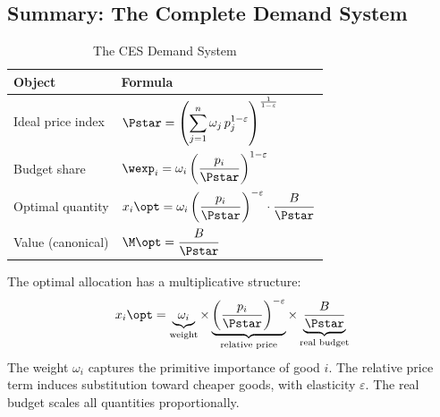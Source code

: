 \subsection{Summary: The Complete Demand System}
\label{subsec:summary}

\begin{table}[H]
\centering
\caption{The CES Demand System}
\label{tab:demand-system}
\renewcommand{\arraystretch}{1.6}
\begin{tabular}{@{}ll@{}}
\toprule
\textbf{Object} & \textbf{Formula} \\
\midrule
Ideal price index & $\displaystyle \Pstar = \left( \sum_{j=1}^{n} \omega_j \, p_j^{1-\varepsilon} \right)^{\frac{1}{1-\varepsilon}}$ \\[12pt]
Budget share & $\displaystyle \wexp_i = \omega_i \left(\frac{p_i}{\Pstar}\right)^{1-\varepsilon}$ \\[12pt]
Optimal quantity & $\displaystyle x_i\opt = \omega_i \left(\frac{p_i}{\Pstar}\right)^{-\varepsilon} \cdot \frac{B}{\Pstar}$ \\[12pt]
Value (canonical) & $\displaystyle \M\opt = \frac{B}{\Pstar}$ \\[8pt]
\bottomrule
\end{tabular}
\end{table}

\begin{callouttip}[Interpretation]
The optimal allocation has a multiplicative structure:
\[
x_i\opt = \underbrace{\omega_i}_{\text{weight}} \times \underbrace{\left(\frac{p_i}{\Pstar}\right)^{-\varepsilon}}_{\text{relative price}} \times \underbrace{\frac{B}{\Pstar}}_{\text{real budget}}
\]
The weight $\omega_i$ captures the primitive importance of good $i$. The relative price term induces substitution toward cheaper goods, with elasticity $\varepsilon$. The real budget scales all quantities proportionally.
\end{callouttip}
